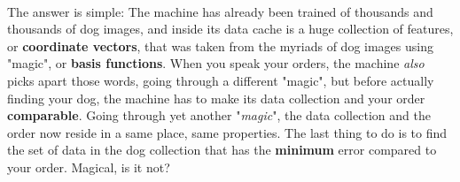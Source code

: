 \documentclass{article}
\begin{document}
\\ \tab \tab The answer is simple: The machine has already been trained of thousands and thousands of dog images, and inside its data cache is a huge collection of features, or \textbf{coordinate vectors}, that was taken from the myriads of dog images using "magic", or \textbf{basis functions}. When you speak your orders, the machine \textit{also} picks apart those words, going through a different "magic", but before actually finding your dog, the machine has to make its data collection and your order \textbf{comparable}. Going through yet another "\textit{magic}", the data collection and the order now reside in a same place, same properties. The last thing to do is to find the set of data in the dog collection that has the \textbf{minimum} error compared to your order. Magical, is it not?
\end{document}
